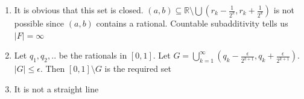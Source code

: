 \documentclass{article}
\begin{document}
\begin{enumerate}
    Let $\{J_k\}$ be open intervals covering $\bigcup I_k$. We need to show
    \[- \epsilon +\sum_{k=1}^Nl(I_k)  \leq \sum_{k=1}^{M}l(J_k)\] for some $M$. Let $I_k=(a_k,b_k)$. 
    
    It suffices to show \[\sum_{k=1}^Nl(a_k+\frac{\epsilon}{2N},b_k-\frac{\epsilon}{2N}) \leq \sum_{k=1}^{M}l(J_k)\]
    
    $(a_k+\frac{\epsilon}{2N},b_k-\frac{\epsilon}{2N})$ is covered by finitely many intervals $\{J_i\}_{i\in S_k}$

    $(a_k+\frac{\epsilon}{2N},b_k-\frac{\epsilon}{2N})=\bigcup_{i \in S_k} J_i \cap (a_k+\frac{\epsilon}{2N},b_k-\frac{\epsilon}{2N})$, so
    \[\sum_{k=1}^N l(a_k+\frac{\epsilon}{2N},b_k-\frac{\epsilon}{2N}) \leq \sum_{k=1}^N \sum_{i \in \cup S_k}l(J_i \cap (a_k+\frac{\epsilon}{2N},b_k-\frac{\epsilon}{2N})) \]

    Now $\{J_i\cap (a_k+\frac{\epsilon}{2N},b_k-\frac{\epsilon}{2N})\}_k$ are disjoint open intervals within $J_i$. Hence we have $l(J_i) \geq \sum_k l(J_i\cap (a_k+\frac{\epsilon}{2N},b_k-\frac{\epsilon}{2N}))$. Hence, switching the order of the summation we get what we want.

    \item
    It is obvious that this set is closed. $(a,b) \subseteq \mathbb{R} \setminus \bigcup (r_k-\frac{1}{2^k},r_k+\frac{1}{2^k})$ is not possible since $(a,b)$ contains a rational. Countable subadditivity tells us $|F|=\infty$

    \item 
    Let $q_1,q_2,..$ be the rationals in $[0,1]$. Let $G= \bigcup_{k=1}^\infty(q_k-\frac{\epsilon}{2^{k+1}},q_k + \frac{\epsilon}{2^{k+1}})$. $|G| \leq \epsilon$. Then $[0,1] \setminus G$ is the required set

    \item
    It is not a straight line
    
\end{enumerate}
\end{document}
